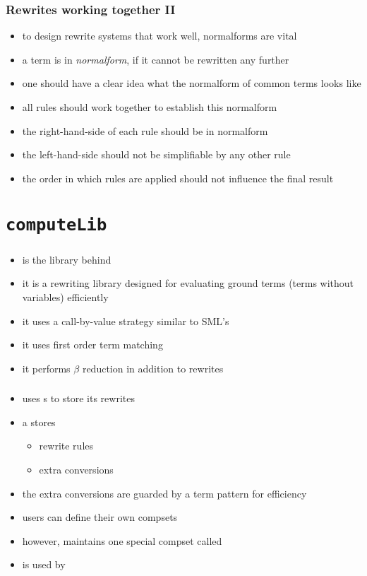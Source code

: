 \begin{frame}
\frametitle{Rewrites working together II}
\begin{itemize}
\item to design rewrite systems that work well, normalforms are vital
\item a term is in \emph{normalform}, if it cannot be rewritten any further
\item one should have a clear idea what the normalform of common terms looks like
\item all rules should work together to establish this normalform
\item the right-hand-side of each rule should be in normalform
\item the left-hand-side should not be simplifiable by any other rule
\item the order in which rules are applied should not influence the final result
\end{itemize}
\end{frame}


\section{\texttt{computeLib}}

\begin{frame}
\frametitle{}

\begin{itemize}
\item {} is the library behind 
\item it is a rewriting library designed for evaluating ground terms (\ie terms without variables) efficiently
\item it uses a call-by-value strategy similar to SML's
\item it uses first order term matching
\item it performs $\beta$ reduction in addition to rewrites
\end{itemize}

\end{frame}


\begin{frame}
\frametitle{}

\begin{itemize}
\item {} uses s to store its rewrites
\item a  stores
\begin{itemize}
\item rewrite rules
\item extra conversions
\end{itemize}
\item the extra conversions are guarded by a term pattern for efficiency
\item users can define their own compsets
\item however,  maintains one special compset called 
\item {} is used by  
\end{itemize}

\end{frame}


